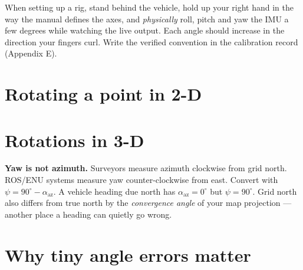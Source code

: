 \begin{tip}
When setting up a rig, stand behind the vehicle, hold up your right hand in the way the manual defines the axes, and \emph{physically} roll, pitch and yaw the IMU a few degrees while watching the live output. Each angle should increase in the direction your fingers curl. Write the verified convention in the calibration record (Appendix E).
\end{tip}

\section{Rotating a point in 2-D}


\section{Rotations in 3-D}

\begin{tip}
\textbf{Yaw is not azimuth.} Surveyors measure azimuth clockwise from grid north. ROS/ENU systems measure yaw counter-clockwise from east. Convert with $\psi=90^\circ-\alpha_{\text{az}}$. A vehicle heading due north has $\alpha_{\text{az}}=0^\circ$ but $\psi=90^\circ$. Grid north also differs from true north by the \emph{convergence angle} of your map projection --- another place a heading can quietly go wrong.
\end{tip}

\section{Why tiny angle errors matter}

